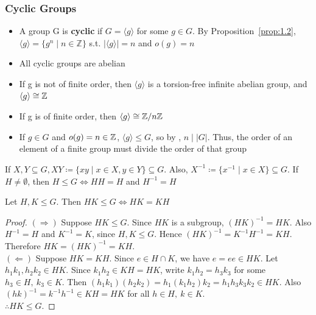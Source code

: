 \documentclass[../Odyssey_Project.tex]{subfiles}
\begin{document}
\subsubsection*{Cyclic Groups}
\begin{itemize}
    \item A group G is \textbf{cyclic} if \(G = \langle g \rangle\) for some \(g \in G\). By Proposition~\ref{prop:1.2}, \(\langle g \rangle = \{g^n \mid n \in \mathbb{Z}\}\) s.t. \(|\langle g \rangle | = n\) and \(o(g) = n\)
    \item All cyclic groups are abelian
    \item If g is not of finite order, then \(\langle g \rangle \) is a torsion-free infinite abelian group, and \(\langle g \rangle \cong \mathbb{Z}\)
    \item If g is of finite order, then \(\langle g \rangle \cong \mathbb{Z} / n \mathbb{Z}\)
    \item If \(g \in G\) and \(o(g) = n \in \mathbb{Z}\), \(\langle g \rangle \leq G\), so by , \(n \mid |G|\). Thus, the order of an element of a finite group must divide the order of that group
\end{itemize}
If \(X,Y \subseteq G, XY \coloneqq \{xy \mid x \in X, y \in Y\} \subseteq G \). Also, \(X^{-1} \coloneqq \{x^{-1} \mid x \in X\} \subseteq G\). If \(H \ne \emptyset\), then \(H \leq G \iff HH = H\) and \(H^{-1} = H\)
\begin{proposition}
\label{prop:1.3}
Let \(H,K \leq G\). Then \(HK \leq G \iff HK = KH\)
\end{proposition}
\begin{proof}
    \((\Rightarrow)\) Suppose \(HK \leq G\). Since \(HK\) is a subgroup, \((HK)^{-1} = HK\). Also \(H^{-1} = H\) and \(K^{-1} = K\), since \(H,K \leq G\). Hence \((HK)^{-1} = K^{-1}H^{-1} = KH\). Therefore \(HK = (HK)^{-1} = KH\). \\
    \((\Leftarrow)\) Suppose \(HK = KH\). Since \(e \in H \cap K\), we have \(e = ee \in HK\). Let \(h_1k_1, h_2k_2 \in HK\). Since \(k_1h_2 \in KH = HK\), write \(k_1h_2 = h_3k_3\) for some \(h_3 \in H,\ k_3 \in K\). Then \((h_1k_1)(h_2k_2) = h_1(k_1h_2)k_2 = h_1h_3k_3k_2 \in HK\). Also \((hk)^{-1} = k^{-1}h^{-1} \in KH = HK\) for all \(h \in H,\ k \in K\). \\
    \(\therefore HK \leq G\).
\end{proof}
\end{document}
